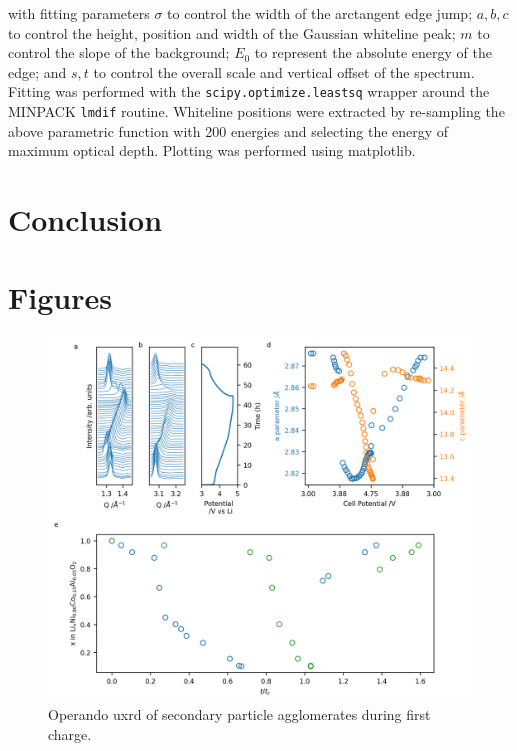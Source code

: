 \documentclass{article}
\begin{document}
with fitting parameters $\sigma$ to control the width of the
arctangent edge jump; $a, b, c$ to control the height, position and
width of the Gaussian whiteline peak; $m$ to control the slope of the
background; $E_0$ to represent the absolute energy of the edge; and
$s, t$ to control the overall scale and vertical offset of the
spectrum. Fitting was performed with the
\texttt{scipy.optimize.leastsq} wrapper around the MINPACK
\texttt{lmdif} routine\cite{scipy}. Whiteline positions were extracted
by re-sampling the above parametric function with 200 energies and
selecting the energy of maximum optical depth. Plotting was performed
using matplotlib\cite{matplotlib}.



\section{Conclusion}

\section*{Figures}

\begin{figure}
  \includegraphics{figures/NCA_xrd.png}
  \caption{Operando \gls{uxrd} of \nca{} secondary particle
    agglomerates during first charge. }
  \label{fig:uxrd}
\end{figure}
\end{document}
